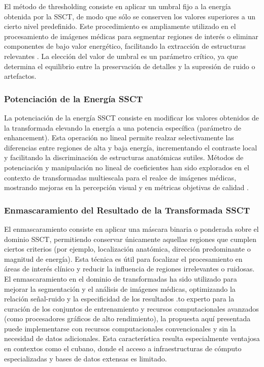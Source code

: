 El método de thresholding consiste en aplicar un umbral fijo a la energía obtenida por la SSCT, de modo que sólo se conserven los valores superiores a un cierto nivel predefinido. Este procedimiento es ampliamente utilizado en el procesamiento de imágenes médicas para segmentar regiones de interés o eliminar componentes de bajo valor energético, facilitando la extracción de estructuras relevantes \cite{zhao2023thresholding, pmc6132127}. La elección del valor de umbral es un parámetro crítico, ya que determina el equilibrio entre la preservación de detalles y la supresión de ruido o artefactos.

\subsubsection{Potenciación de la Energía SSCT}

La potenciación de la energía SSCT consiste en modificar los valores obtenidos de la transformada elevando la energía a una potencia específica (parámetro de enhancement). Esta operación no lineal permite realzar selectivamente las diferencias entre regiones de alta y baja energía, incrementando el contraste local y facilitando la discriminación de estructuras anatómicas sutiles. Métodos de potenciación y manipulación no lineal de coeficientes han sido explorados en el contexto de transformadas multiescala para el realce de imágenes médicas, mostrando mejoras en la percepción visual y en métricas objetivas de calidad \cite{SynchrosqueezedCurveletTransform, EnergyEnhancement}.

\subsubsection{Enmascaramiento del Resultado de la Transformada SSCT}

El enmascaramiento consiste en aplicar una máscara binaria o ponderada sobre el dominio SSCT, permitiendo conservar únicamente aquellas regiones que cumplen ciertos criterios (por ejemplo, localización anatómica, dirección predominante o magnitud de energía). Esta técnica es útil para focalizar el procesamiento en áreas de interés clínico y reducir la influencia de regiones irrelevantes o ruidosas. El enmascaramiento en el dominio de transformadas ha sido utilizado para mejorar la segmentación y el análisis de imágenes médicas, optimizando la relación señal-ruido y la especificidad de los resultados \cite{SynchrosqueezedCurveletTransform,ImageMaskingBook}.to experto para la curación de los conjuntos de entrenamiento y recursos computacionales avanzados (como procesadores gráficos de alto rendimiento), la propuesta aquí presentada puede implementarse con recursos computacionales convencionales y sin la necesidad de datos adicionales. Esta característica resulta especialmente ventajosa en contextos como el cubano, donde el acceso a infraestructuras de cómputo especializadas y bases de datos extensas es limitado.

